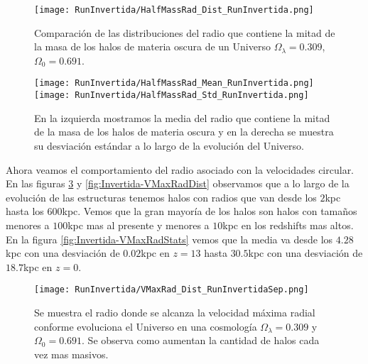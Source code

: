 \begin{figure}[H]
    \centering
    \texttt{[image: RunInvertida/HalfMassRad\_Dist\_RunInvertida.png]}
    \caption[Distribución del Radio que contiene la mitad de la masa de un Universo $\Omega_\lambda = 0.309 $, $\Omega_0 = 0.691$]{\footnotesize Comparación de las distribuciones del radio que contiene la mitad de la masa de los halos de materia oscura de un Universo $\Omega_\lambda = 0.309 $, $\Omega_0 = 0.691$.}
    \label{fig:Invertida-HalfMassRadDist}
\end{figure}

\begin{figure}[H]
    \centering
    \texttt{[image: RunInvertida/HalfMassRad\_Mean\_RunInvertida.png]}
    \texttt{[image: RunInvertida/HalfMassRad\_Std\_RunInvertida.png]}
    \caption[Media y desviación estándar del radio de la mitad de la masa de un Universo $\Omega_\lambda = 0.309 $, $\Omega_0 = 0.691$]{\footnotesize En la izquierda mostramos la media del radio que contiene la mitad de la masa de los halos de materia oscura y en la derecha se muestra su desviación estándar a lo largo de la evolución del Universo.}
    \label{fig:Invertida-HalfMassRadStats}
\end{figure}

Ahora veamos el comportamiento del radio asociado con la velocidades circular. En las figuras \ref{fig:Invertida-VMaxRadDistSep} y \ref{fig:Invertida-VMaxRadDist} observamos que a lo largo de la evolución de las estructuras tenemos halos con radios que van desde los $2$kpc hasta los $600$kpc. Vemos que la gran mayoría de los halos son halos con tamaños menores a $100$kpc mas al presente y menores a $10$kpc en los redshifts mas altos. En la figura \ref{fig:Invertida-VMaxRadStats} vemos que la media va desde los $4.28$kpc con una desviación de $0.02$kpc en $z=13$ hasta $30.5$kpc con una desviación de $18.7$kpc en $z=0$.

\begin{figure}[H]
    \centering
    \texttt{[image: RunInvertida/VMaxRad\_Dist\_RunInvertidaSep.png]}
    \caption[Radio donde se alcanza la velocidad máxima radial en la evolución de un Universo $\Omega_\lambda = 0.309 $, $\Omega_0 = 0.691$]{\footnotesize Se muestra el radio donde se alcanza la velocidad máxima radial conforme evoluciona el Universo en una cosmología $\Omega_\lambda = 0.309 $ y $\Omega_0 = 0.691$. Se observa como aumentan la cantidad de halos cada vez mas masivos.}
    \label{fig:Invertida-VMaxRadDistSep}
\end{figure}

